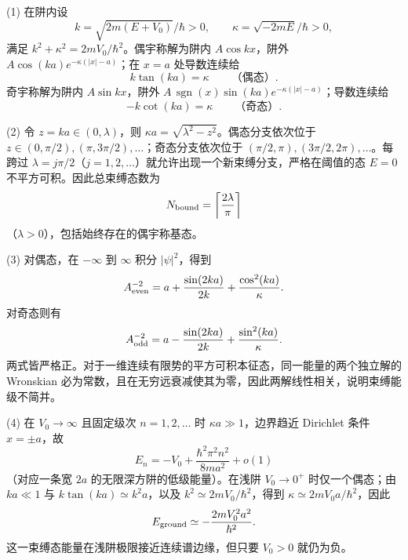(1) 在阱内设
\[
k=\sqrt{2m(E+V_0)}/\hbar>0,\qquad
\kappa=\sqrt{-2mE}/\hbar>0,
\]
满足 \(k^2+\kappa^2=2mV_0/\hbar^2\)。偶宇称解为阱内 \(A\cos kx\)，阱外 \(A\cos(ka)e^{-\kappa(|x|-a)}\)；在 \(x=a\) 处导数连续给
\[
k\tan(ka)=\kappa\qquad\text{（偶态）}.
\]
奇宇称解为阱内 \(A\sin kx\)，阱外 \(A\,\operatorname{sgn}(x)\sin(ka)e^{-\kappa(|x|-a)}\)；导数连续给
\[
-k\cot(ka)=\kappa\qquad\text{（奇态）}.
\]

(2) 令 \(z=ka\in(0,\lambda)\)，则 \(\kappa a=\sqrt{\lambda^2-z^2}\)。偶态分支依次位于 \(z\in(0,\pi/2),(\pi,3\pi/2),\ldots\)；奇态分支依次位于 \((\pi/2,\pi),(3\pi/2,2\pi),\ldots\)。每跨过 \(\lambda=j\pi/2\)（\(j=1,2,\ldots\)）就允许出现一个新束缚分支，严格在阈值的态 \(E=0\) 不平方可积。因此总束缚态数为
\[
N_{\rm bound}=\left\lceil\frac{2\lambda}{\pi}\right\rceil
\]
（\(\lambda>0\)），包括始终存在的偶宇称基态。

(3) 对偶态，在 \(-\infty\) 到 \(\infty\) 积分 \(|\psi|^2\)，得到
\[
A_{\rm even}^{-2}=a+\frac{\sin(2ka)}{2k}+\frac{\cos^2(ka)}{\kappa}.
\]
对奇态则有
\[
A_{\rm odd}^{-2}=a-\frac{\sin(2ka)}{2k}+\frac{\sin^2(ka)}{\kappa}.
\]
两式皆严格正。对于一维连续有限势的平方可积本征态，同一能量的两个独立解的 Wronskian 必为常数，且在无穷远衰减使其为零，因此两解线性相关，说明束缚能级不简并。

(4) 在 \(V_0\to\infty\) 且固定级次 \(n=1,2,\ldots\) 时 \(\kappa a\gg1\)，边界趋近 Dirichlet 条件 \(x=\pm a\)，故
\[
E_n=-V_0+\frac{\hbar^2\pi^2n^2}{8ma^2}+o(1)
\]
（对应一条宽 \(2a\) 的无限深方阱的低级能量）。在浅阱 \(V_0\to0^+\) 时仅一个偶态；由 \(ka\ll1\) 与 \(k\tan(ka)\simeq k^2a\)，以及 \(k^2\simeq2mV_0/\hbar^2\)，得到 \(\kappa\simeq2mV_0a/\hbar^2\)，因此
\[
E_{\rm ground}\simeq-\frac{2mV_0^2a^2}{\hbar^2}.
\]
这一束缚态能量在浅阱极限接近连续谱边缘，但只要 \(V_0>0\) 就仍为负。

